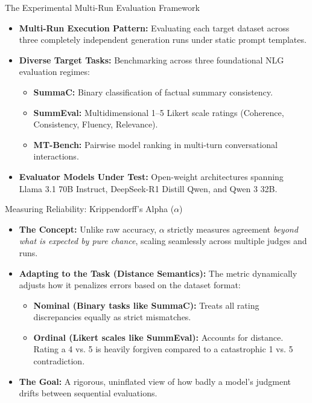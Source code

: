 \documentclass[10pt]{beamer}
\begin{document}
\begin{frame}{The Experimental Multi-Run Evaluation Framework}
  \begin{itemize}
    \item \textbf{Multi-Run Execution Pattern:} Evaluating each target dataset across three completely independent generation runs under static prompt templates.
    \item \textbf{Diverse Target Tasks:} Benchmarking across three foundational NLG evaluation regimes:
      \begin{itemize}
        \item \textbf{SummaC:} Binary classification of factual summary consistency.
        \item \textbf{SummEval:} Multidimensional 1--5 Likert scale ratings (Coherence, Consistency, Fluency, Relevance).
        \item \textbf{MT-Bench:} Pairwise model ranking in multi-turn conversational interactions.
      \end{itemize}
    \item \textbf{Evaluator Models Under Test:} Open-weight architectures spanning Llama 3.1 70B Instruct, DeepSeek-R1 Distill Qwen, and Qwen 3 32B.
  \end{itemize}
\end{frame}

\begin{frame}{Measuring Reliability: Krippendorff's Alpha ($\alpha$)}
  \begin{itemize}
    \item \textbf{The Concept:} Unlike raw accuracy, $\alpha$ strictly measures agreement \textit{beyond what is expected by pure chance}, scaling seamlessly across multiple judges and runs.
    \item \textbf{Adapting to the Task (Distance Semantics):} The metric dynamically adjusts how it penalizes errors based on the dataset format:
      \begin{itemize}
        \item \textbf{Nominal (Binary tasks like SummaC):} Treats all rating discrepancies equally as strict mismatches.
        \item \textbf{Ordinal (Likert scales like SummEval):} Accounts for distance. Rating a 4 vs. 5 is heavily forgiven compared to a catastrophic 1 vs. 5 contradiction.
      \end{itemize}
    \item \textbf{The Goal:} A rigorous, uninflated view of how badly a model's judgment drifts between sequential evaluations.
  \end{itemize}
\end{frame}
\end{document}
